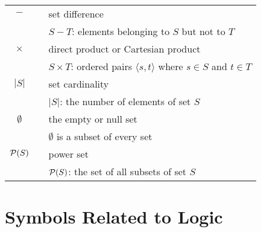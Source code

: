 \begin{tabular}{c|cl}
$-$
  & & set difference \\ 
  & & $S - T$: elements belonging to $S$ but not to $T$ \\ \hline
$\times$
  & & direct product or Cartesian product \\
  & & $S \times T$: ordered pairs $\langle s,t \rangle$ where $s \in S$ and $t \in T$ \\ \hline
$|S|$
  & & set cardinality \\
  & & $|S|$: the number of elements of set $S$ \\ \hline
$\emptyset$
  & & the empty or null set \\
  & & $\emptyset$ is a subset of every set \\ \hline
$\mbox{$\cal P$}(S)$
  & & power set \\
  & & $\mbox{$\cal P$}(S)$: the set of all subsets of set $S$ \\ \hline
\end{tabular}

\section*{Symbols Related to Logic}

